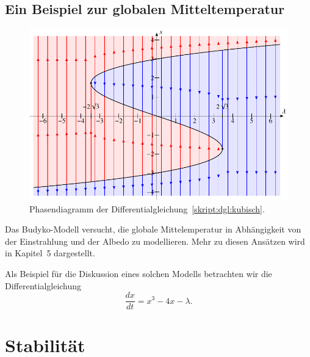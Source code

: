\subsection{Ein Beispiel zur globalen Mitteltemperatur}
\begin{figure}
\includegraphics{chapters/3/kubisch.pdf}
\caption{Phasendiagramm der Differentialgleichung~\eqref{skript:dgl:kubisch}.
\label{skript:dgl:kubischfig}}
\end{figure}
Das Budyko-Modell versucht, die globale Mittelemperatur in Abhängigkeit
von der Einstrahlung und der Albedo zu modellieren.
Mehr zu diesen Ansätzen wird in Kapitel~5 dargestellt.

Als Beispiel für die Diskussion eines solchen Modells betrachten wir
die Differentialgleichung
\begin{equation}
\frac{dx}{dt}
=
x^3 - 4x - \lambda.
\label{skript:dgl:kubisch}
\end{equation}

\section{Stabilität}

